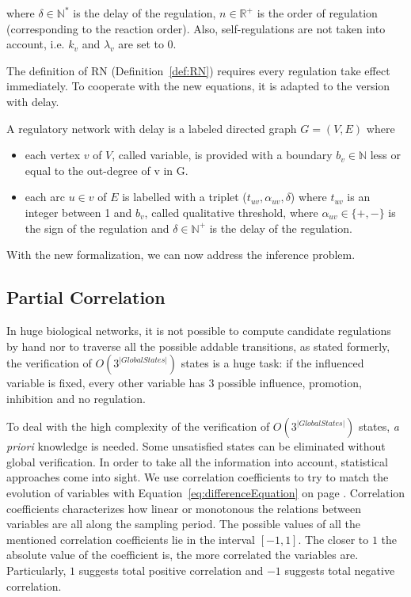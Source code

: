 where $\delta\in \mathbb{N}^{*}$ is the delay of the regulation, $n\in \mathbb{R}^{+}$ is the order of regulation (corresponding to the reaction order).
Also, self-regulations are not taken into account, i.e. $k_v$ and $\lambda_v$ are set to 0.

The definition of RN (Definition~\ref{def:RN}) requires every regulation take effect immediately.
To cooperate with the new equations, it is adapted to the version with delay.

\begin{definition}
A regulatory network with delay is a labeled directed graph $G=(V,E)$ where 
\begin{itemize}
    \item each vertex $v$ of $V$, called variable, is provided with a boundary $b_v\in \mathbb{N}$ less or equal to the out-degree of v in G.
    \item each arc $u\in v$ of $E$ is labelled with a triplet ($t_{uv}, \alpha_{uv}, \delta$) where $t_{uv}$ is an integer between 1 and $b_v$, called qualitative threshold, where $\alpha_{uv}\in \{+,-\}$ is the sign of the regulation and $\delta\in \mathbb{N^+}$ is the delay of the regulation.
\end{itemize}
\end{definition}

With the new formalization, we can now address the inference problem.

\subsection{Partial Correlation}

In huge biological networks, it is not possible to compute candidate regulations by hand nor to traverse all the possible addable transitions, as stated formerly, the verification of $O(3^{|Global States|})$ states is a huge task: if the influenced variable is fixed, every other variable has 3 possible influence, promotion, inhibition and no regulation.
 
To deal with the high complexity of the verification of $O(3^{|Global States|})$ states, \textit{a priori} knowledge is needed. 
Some unsatisfied states can be eliminated without global verification.  
In order to take all the information into account, statistical approaches come into sight.
We use correlation coefficients to try to match the evolution of variables with Equation~\ref{eq:differenceEquation} on page \pageref{eq:differenceEquation}.
Correlation coefficients characterizes how linear or monotonous the relations between variables are all along the sampling period.
The possible values of all the mentioned correlation coefficients lie in the interval $[-1,1]$.
The closer to $1$ the absolute value of the coefficient is, the more correlated the variables are.
Particularly, $1$ suggests total positive correlation and $-1$ suggests total negative correlation. 

